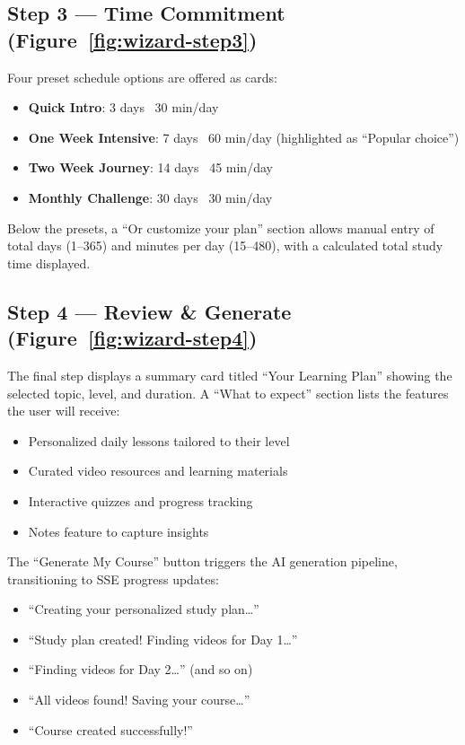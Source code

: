 \documentclass[12pt,a4paper]{report}
\begin{document}
\subsection{Step 3 --- Time Commitment (Figure~\ref{fig:wizard-step3})}
Four preset schedule options are offered as cards:
\begin{itemize}[noitemsep]
    \item \textbf{Quick Intro}: 3 days \texttimes\ 30 min/day
    \item \textbf{One Week Intensive}: 7 days \texttimes\ 60 min/day (highlighted as ``Popular choice'')
    \item \textbf{Two Week Journey}: 14 days \texttimes\ 45 min/day
    \item \textbf{Monthly Challenge}: 30 days \texttimes\ 30 min/day
\end{itemize}
Below the presets, a ``Or customize your plan'' section allows manual entry of total days (1--365) and minutes per day (15--480), with a calculated total study time displayed.

\subsection{Step 4 --- Review \& Generate (Figure~\ref{fig:wizard-step4})}
The final step displays a summary card titled ``Your Learning Plan'' showing the selected topic, level, and duration. A ``What to expect'' section lists the features the user will receive:
\begin{itemize}[noitemsep]
    \item Personalized daily lessons tailored to their level
    \item Curated video resources and learning materials
    \item Interactive quizzes and progress tracking
    \item Notes feature to capture insights
\end{itemize}
The ``Generate My Course'' button triggers the AI generation pipeline, transitioning to SSE progress updates:
\begin{itemize}[noitemsep]
    \item ``Creating your personalized study plan\ldots''
    \item ``Study plan created! Finding videos for Day 1\ldots''
    \item ``Finding videos for Day 2\ldots'' (and so on)
    \item ``All videos found! Saving your course\ldots''
    \item ``Course created successfully!''
\end{itemize}
\end{document}
